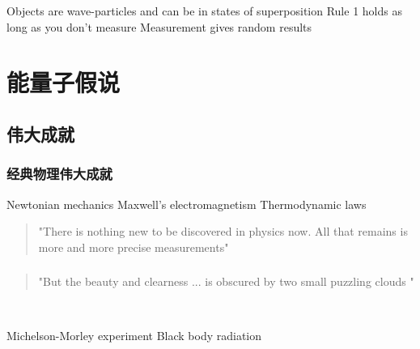 \begin{frame}[t]
    \begin{tcolorbox4}[三条军规]    
        \begin{enumerate}
            \Item Objects are wave-particles and can be in states of superposition
            \Item Rule 1 holds as long as you don't measure
            \Item Measurement gives random results
        \end{enumerate}
    \end{tcolorbox4} 
\end{frame}

\section{能量子假说}

\subsection{伟大成就}

\begin{frame}[t]
    \frametitle{经典物理伟大成就}
    \begin{tcolorbox3}
        \begin{enumerate}
            \Item Newtonian mechanics
            \Item Maxwell's electromagnetism
            \Item Thermodynamic laws
        \end{enumerate}
    \end{tcolorbox3}  
    \begin{quotation}
        "There is nothing new to be discovered in physics now. All that remains is 
        more and more precise measurements"   \\
    \end{quotation}
\end{frame}

\begin{frame}
    \frametitle{}
    \begin{quotation}
        "But the beauty and clearness ... is obscured by two small puzzling clouds \faCloud "  \\
    \end{quotation}
    ~~ \vspace{0.3em}
    \begin{tcolorbox4}[两朵乌云]    
        \begin{enumerate}
        \Item Michelson-Morley experiment
        \Item Black body radiation
        \end{enumerate}
    \end{tcolorbox4} 
\end{frame}

